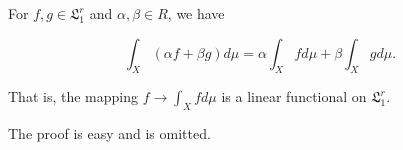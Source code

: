 For $f, g \in \mathfrak{L}_1^r$ and $\alpha, \beta \in R$, we have

$$\int_X (\alpha f + \beta g) d\mu = \alpha \int_X f d\mu + \beta \int_X g d\mu.$$

That is, the mapping $f \rightarrow \int_X f d\mu$ is a linear functional on $\mathfrak{L}_1^r$.

The proof is easy and is omitted.